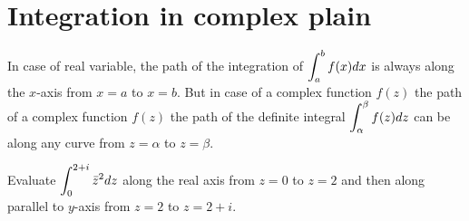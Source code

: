\section{Integration in complex plain}
In case of real variable, the path of the integration of $\displaystyle \int_a^b f(x)dx$ is always along the $x$-axis from $x=a$ to $x=b$. But in case of a complex function $f(z)$ the path of a complex function $f(z)$ the path of the definite integral $\displaystyle \int_{\alpha}^{\beta} f(z)dz$ can be along any curve from $z=\alpha$ to $z=\beta$. 
\begin{example}
Evaluate $\displaystyle \int_{0}^{2+i} \bar{z}^2 dz$ along the real axis from $z=0$ to $z=2$ and then along parallel to $y$-axis from $z=2$ to $z=2+i$.
\end{example}

